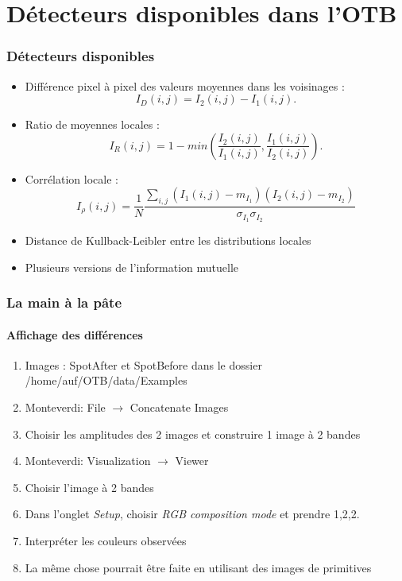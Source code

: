 \documentclass[compress]{beamer}
\begin{document}
\section[Détecteurs]{Détecteurs disponibles dans l'OTB}
\begin{frame}
  \frametitle{Détecteurs disponibles}
  \small
  \begin{itemize}
    \item Différence pixel à pixel des valeurs moyennes dans les
      voisinages :
      \begin{equation}
	I_{D}(i,j)=I_{2}(i,j)-I_{1}(i,j).
      \end{equation}
    \item Ratio de moyennes locales :
      \begin{equation}
\displaystyle I_{R}(i,j) = 1 - min \left(\frac{\displaystyle I_{2}(i,j)}{\displaystyle I_{1}(i,j)},\frac{\displaystyle I_{1}(i,j)}{\displaystyle I_{2}(i,j)}\right).
\end{equation}
      \item Corrélation locale :
\begin{equation}
  I_\rho(i,j) = \frac{1}{N}\frac{\sum_{i,j}(I_1(i,j)-m_{I_1})(I_2(i,j)-m_{I_2})}{\sigma_{I_1}
\sigma_{I_2}}
\end{equation}
\item Distance de Kullback-Leibler entre les distributions locales
  \item Plusieurs versions de l'information mutuelle
  \end{itemize}
  \normalsize
\end{frame}

\begin{frame}
  \frametitle{La main à la pâte}
  \framesubtitle{Affichage des différences}
  \begin{enumerate}
  \item Images : SpotAfter et SpotBefore dans le dossier /home/auf/OTB/data/Examples
  \item Monteverdi: File $\rightarrow$ Concatenate Images
  \item Choisir les amplitudes des 2 images et construire 1 image à 2 bandes
  \item Monteverdi: Visualization $\rightarrow$ Viewer
  \item Choisir l'image à 2 bandes
  \item Dans l'onglet {\em Setup}, choisir {\em RGB composition mode}
    et prendre 1,2,2.
  \item Interpréter les couleurs observées
  \item La même chose pourrait être faite en utilisant des images de primitives
  \end{enumerate}
\end{frame}
\end{document}

